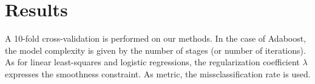 \documentclass[10pt,conference,compsocconf]{IEEEtran}
\begin{document}
\section{Results}
\label{sec:orgheadline11}
A 10-fold cross-validation is performed on our methods. In the case of Adaboost, the model complexity is given by the number of stages (or number of iterations). As for linear least-squares and logistic regressions, the regularization coefficient \(\lambda\) expresses the smoothness constraint.
As metric, the missclassification rate is used.




\printbibliography
\end{document}
